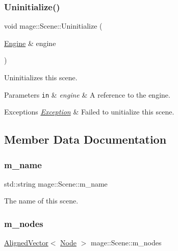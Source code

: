 \subsubsection{\texorpdfstring{Uninitialize()}{Uninitialize()}}
{\footnotesize\ttfamily void mage\+::\+Scene\+::\+Uninitialize (\begin{DoxyParamCaption}\item[{\mbox{\hyperlink{classmage_1_1_engine}{Engine}} \&}]{engine }\end{DoxyParamCaption})}

Uninitializes this scene.


\begin{DoxyParams}[1]{Parameters}
\mbox{\tt in}  & {\em engine} & A reference to the engine. \\
\hline
\end{DoxyParams}

\begin{DoxyExceptions}{Exceptions}
{\em \mbox{\hyperlink{classmage_1_1_exception}{Exception}}} & Failed to unitialize this scene. \\
\hline
\end{DoxyExceptions}


\subsection{Member Data Documentation}
\mbox{\label{classmage_1_1_scene_aebd60452eca5423c3bde3fca653f3533}} 
\subsubsection{\texorpdfstring{m\+\_\+name}{m\_name}}
{\footnotesize\ttfamily std\+::string mage\+::\+Scene\+::m\+\_\+name\hspace{0.3cm}{\ttfamily [private]}}

The name of this scene. \mbox{\label{classmage_1_1_scene_a270ac4a26210b95ba05957af19c4c43c}} 
\subsubsection{\texorpdfstring{m\+\_\+nodes}{m\_nodes}}
{\footnotesize\ttfamily \mbox{\hyperlink{namespacemage_a8664bfb5ce2179fc64eae9f82c8a5ba8}{Aligned\+Vector}}$<$ \mbox{\hyperlink{classmage_1_1_node}{Node}} $>$ mage\+::\+Scene\+::m\+\_\+nodes\hspace{0.3cm}{\ttfamily [private]}}

